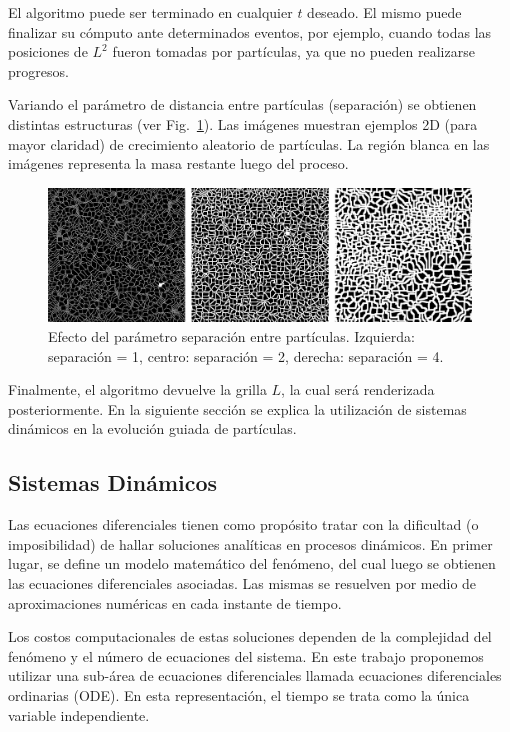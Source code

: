 El algoritmo puede ser terminado en cualquier $t$ deseado. El mismo puede finalizar su c\'omputo ante determinados eventos, por ejemplo, cuando todas las posiciones de $L^{2}$ fueron tomadas por part\'iculas, ya que no pueden realizarse progresos.

Variando el par\'ametro de distancia entre part\'iculas (separación) se obtienen distintas estructuras (ver Fig.~\ref{fg:sistdin1}). Las im\'agenes muestran ejemplos 2D (para mayor claridad) de crecimiento aleatorio de part\'iculas. La regi\'on blanca en las im\'agenes representa la masa restante luego del proceso.


\begin{figure}[htb!]
  \centerline{\includegraphics[width=13cm]{figures/sistdin1}}
  \caption[Efecto del parámetro separación entre partículas.]{Efecto del parámetro separación entre partículas. Izquierda: separaci\'on = 1, centro: separaci\'on = 2, derecha: separaci\'on = 4.}
  \label{fg:sistdin1}
\end{figure}

Finalmente, el algoritmo devuelve la grilla $L$, la cual ser\'a renderizada posteriormente. En la siguiente secci\'on se explica la utilizaci\'on de sistemas din\'amicos en la evoluci\'on guiada de part\'iculas.

\subsection{Sistemas Din\'amicos}

Las ecuaciones diferenciales tienen como prop\'osito tratar con la dificultad (o imposibilidad) de hallar soluciones anal\'iticas en procesos din\'amicos.
En primer lugar, se define un modelo matem\'atico del fenómeno, del cual luego se obtienen 
las ecuaciones diferenciales asociadas. Las mismas se resuelven por medio de aproximaciones num\'ericas en cada instante de tiempo.

Los costos computacionales de estas soluciones dependen de la complejidad del fenómeno y el n\'umero de ecuaciones del sistema. En este trabajo proponemos utilizar una sub-\'area de ecuaciones diferenciales llamada ecuaciones diferenciales ordinarias (ODE). En esta representaci\'on, el tiempo se trata como la \'unica variable independiente.



